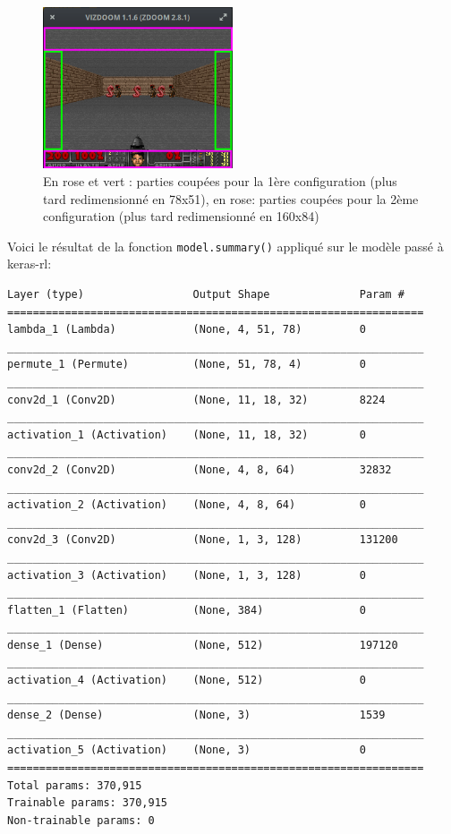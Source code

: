 \documentclass[a4paper,10pt,openany,oneside]{report}
\begin{document}
\begin{figure}[H]
	\centering
	\includegraphics[width=0.5\textwidth]{img/croppedDoomFrame.png}
	\caption{En rose et vert : parties coupées pour la 1ère configuration (plus tard redimensionné en 78x51), en rose: parties coupées pour la 2ème configuration (plus tard redimensionné en 160x84)}
\end{figure}
Voici le résultat de la fonction \lstinline{model.summary()} appliqué sur le modèle passé à keras-rl:
\begin{lstlisting}
Layer (type)                 Output Shape              Param #
=================================================================
lambda_1 (Lambda)            (None, 4, 51, 78)         0
_________________________________________________________________
permute_1 (Permute)          (None, 51, 78, 4)         0
_________________________________________________________________
conv2d_1 (Conv2D)            (None, 11, 18, 32)        8224
_________________________________________________________________
activation_1 (Activation)    (None, 11, 18, 32)        0
_________________________________________________________________
conv2d_2 (Conv2D)            (None, 4, 8, 64)          32832
_________________________________________________________________
activation_2 (Activation)    (None, 4, 8, 64)          0
_________________________________________________________________
conv2d_3 (Conv2D)            (None, 1, 3, 128)         131200
_________________________________________________________________
activation_3 (Activation)    (None, 1, 3, 128)         0
_________________________________________________________________
flatten_1 (Flatten)          (None, 384)               0
_________________________________________________________________
dense_1 (Dense)              (None, 512)               197120
_________________________________________________________________
activation_4 (Activation)    (None, 512)               0
_________________________________________________________________
dense_2 (Dense)              (None, 3)                 1539
_________________________________________________________________
activation_5 (Activation)    (None, 3)                 0
=================================================================
Total params: 370,915
Trainable params: 370,915
Non-trainable params: 0
\end{lstlisting}
\end{document}
